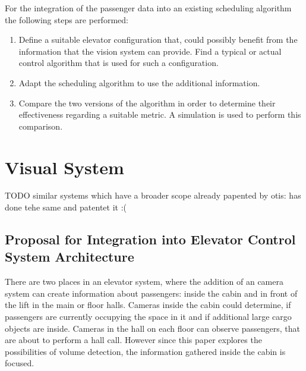 For the integration of the passenger data into an existing scheduling algorithm the following steps are performed:

\begin{enumerate}
    \item Define a suitable elevator configuration that, could possibly benefit from the information that the vision system can provide. 
    Find a typical or actual control algorithm that is used for such a configuration.
    \item Adapt the scheduling algorithm to use the additional information.
    \item Compare the two versions of the algorithm in order to determine their effectiveness regarding a suitable metric.
    A simulation is used to perform this comparison.
\end{enumerate}

 
\section{Visual System}
TODO
similar systems which have a broader scope already papented by otis:
\autocite{lin2011control}
\autocite[][]{xang2016trafficlist} has done tehe same and patentet it :(

\subsection{Proposal for Integration into Elevator Control System Architecture}

There are two places in an elevator system, where the addition of an camera system can create information about passengers: inside the cabin and in front of the lift in the main or floor halls.
Cameras inside the cabin could determine, if passengers are currently occupying the space in it and if additional large cargo objects are inside.
Cameras in the hall on each floor can observe passengers, that are about to perform a hall call.
However since this paper explores the possibilities of volume detection, 
the information gathered inside the cabin is focused.

